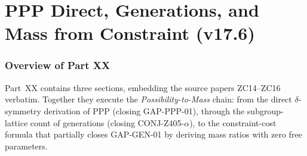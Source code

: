 \documentclass[12pt, a4paper]{article}
\begin{document}
\bigskip

\part{PPP Direct, Generations, and Mass from Constraint (v17.6)}
\label{part:XX}

\section*{Overview of Part XX}

Part~XX contains three sections, embedding the source papers
ZC14--ZC16 verbatim. Together they execute the
\emph{Possibility-to-Mass} chain: from the direct $\delta$-symmetry
derivation of PPP (closing GAP-PPP-01), through the subgroup-lattice
count of generations (closing CONJ-Z405-$\alpha$), to the constraint-cost
formula that partially closes GAP-GEN-01 by deriving mass ratios with
zero free parameters.
\end{document}
